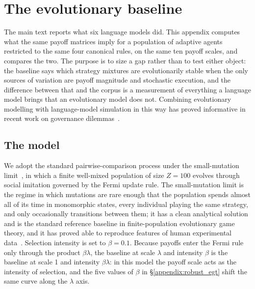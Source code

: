 \documentclass[11pt,a4paper]{article}
\newcommand{\lam}{\lambda}
\newcommand{\rev}[1]{{\color{red}#1}}
\newcommand{\rev}[1]{#1}
\begin{document}
\FloatBarrier


\section{The evolutionary baseline}\label{appendix:egt}

The main text reports what six language models did. This appendix computes what the same payoff matrices imply for a population of adaptive agents restricted to the same four canonical rules, on the same ten payoff scales, and compares the two. The purpose is to size a gap rather than to test either object: the baseline says which strategy mixtures are evolutionarily stable when the only sources of variation are payoff magnitude and stochastic execution, and the difference between that and the corpus is a measurement of everything a language model brings that an evolutionary model does not. Combining evolutionary modelling with language-model simulation in this way has proved informative in recent work on governance dilemmas~\cite{balabanova2025media,buscemi2025llms}.

\subsection{The model}\label{appendix:egt_model}

We adopt the standard pairwise-comparison process under the small-mutation limit~\cite{sigmund:2010bo,han_when_2021,nowak2004emergence,liu2020evolutionary}, in which a finite well-mixed population of size $Z = 100$ evolves through social imitation governed by the Fermi update rule. The small-mutation limit is the regime in which mutations are rare enough that the population spends almost all of its time in monomorphic states, every individual playing the same strategy, and only occasionally transitions between them; it has a clean analytical solution and is the standard reference baseline in finite-population evolutionary game theory, and it has proved able to reproduce features of human experimental data~\cite{rand2013evolution,zisis2015generosity}. Selection intensity is set to $\beta = 0.1$.  \rev{Because payoffs enter the Fermi rule only through the product $\beta\lam$, the baseline at scale $\lam$ and intensity $\beta$ is the baseline at scale 1 and intensity $\beta\lam$: in this model the payoff scale acts as the intensity of selection, and the five values of $\beta$ in \S\ref{appendix:robust_egt} shift the same curve along the $\lam$ axis.}
\end{document}
